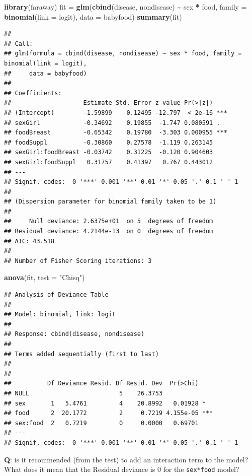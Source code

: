 \documentclass[
  ignorenonframetext,
]{beamer}
\newenvironment{Shaded}{\begin{snugshade}}{\end{snugshade}}
\newcommand{\AttributeTok}[1]{\textcolor[rgb]{0.13,0.29,0.53}{#1}}
\newcommand{\FunctionTok}[1]{\textcolor[rgb]{0.13,0.29,0.53}{\textbf{#1}}}
\newcommand{\NormalTok}[1]{#1}
\newcommand{\OtherTok}[1]{\textcolor[rgb]{0.56,0.35,0.01}{#1}}
\newcommand{\SpecialCharTok}[1]{\textcolor[rgb]{0.81,0.36,0.00}{\textbf{#1}}}
\newcommand{\StringTok}[1]{\textcolor[rgb]{0.31,0.60,0.02}{#1}}
\begin{document}
\begin{frame}[fragile]
\footnotesize

\begin{Shaded}
\begin{Highlighting}[]
\FunctionTok{library}\NormalTok{(faraway)}
\NormalTok{fit }\OtherTok{=} \FunctionTok{glm}\NormalTok{(}\FunctionTok{cbind}\NormalTok{(disease, nondisease) }\SpecialCharTok{\textasciitilde{}}\NormalTok{ sex }\SpecialCharTok{*}\NormalTok{ food, }\AttributeTok{family =} \FunctionTok{binomial}\NormalTok{(}\AttributeTok{link =}\NormalTok{ logit),}
    \AttributeTok{data =}\NormalTok{ babyfood)}
\FunctionTok{summary}\NormalTok{(fit)}
\end{Highlighting}
\end{Shaded}

\begin{verbatim}
## 
## Call:
## glm(formula = cbind(disease, nondisease) ~ sex * food, family = binomial(link = logit), 
##     data = babyfood)
## 
## Coefficients:
##                    Estimate Std. Error z value Pr(>|z|)    
## (Intercept)        -1.59899    0.12495 -12.797  < 2e-16 ***
## sexGirl            -0.34692    0.19855  -1.747 0.080591 .  
## foodBreast         -0.65342    0.19780  -3.303 0.000955 ***
## foodSuppl          -0.30860    0.27578  -1.119 0.263145    
## sexGirl:foodBreast -0.03742    0.31225  -0.120 0.904603    
## sexGirl:foodSuppl   0.31757    0.41397   0.767 0.443012    
## ---
## Signif. codes:  0 '***' 0.001 '**' 0.01 '*' 0.05 '.' 0.1 ' ' 1
## 
## (Dispersion parameter for binomial family taken to be 1)
## 
##     Null deviance: 2.6375e+01  on 5  degrees of freedom
## Residual deviance: 4.2144e-13  on 0  degrees of freedom
## AIC: 43.518
## 
## Number of Fisher Scoring iterations: 3
\end{verbatim}

\begin{Shaded}
\begin{Highlighting}[]
\FunctionTok{anova}\NormalTok{(fit, }\AttributeTok{test =} \StringTok{"Chisq"}\NormalTok{)}
\end{Highlighting}
\end{Shaded}

\begin{verbatim}
## Analysis of Deviance Table
## 
## Model: binomial, link: logit
## 
## Response: cbind(disease, nondisease)
## 
## Terms added sequentially (first to last)
## 
## 
##          Df Deviance Resid. Df Resid. Dev  Pr(>Chi)    
## NULL                         5    26.3753              
## sex       1   5.4761         4    20.8992   0.01928 *  
## food      2  20.1772         2     0.7219 4.155e-05 ***
## sex:food  2   0.7219         0     0.0000   0.69701    
## ---
## Signif. codes:  0 '***' 0.001 '**' 0.01 '*' 0.05 '.' 0.1 ' ' 1
\end{verbatim}

\normalsize

\textbf{Q}: is it recommended (from the test) to add an interaction term
to the model? What does it mean that the Residual deviance is 0 for the
\texttt{sex*food} model?
\end{frame}
\end{document}
